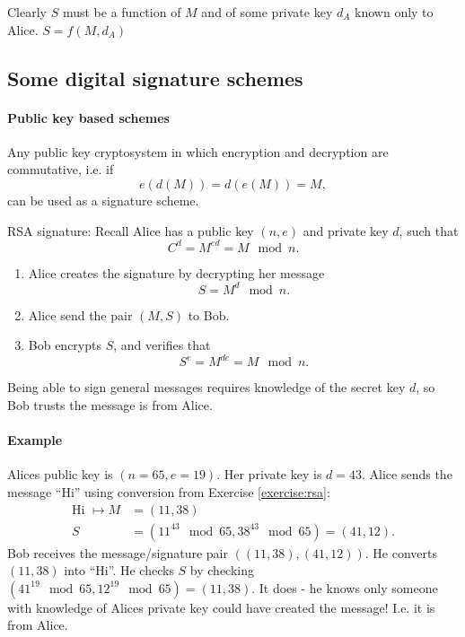 \documentclass[a4paper, 11pt, openany]{book}
\begin{document}
Clearly $S$ must be a function of $M$ and of some private key $d_A$ known only to Alice. $S = f(M,d_A)$


\subsection{Some digital signature schemes}

\paragraph{Public key based schemes}


Any public key cryptosystem in which encryption and decryption are commutative, i.e. if
\[
    e(d(M)) = d(e(M)) = M,
\]
can be used as a signature scheme.

RSA signature: Recall Alice has a public key $(n,e)$ and private key $d$, such that
\[
    C^d = M^{ed} = M \mod n.
\]
\begin{enumerate}
    \item Alice creates the signature by decrypting her message
    \[
    	S = M^d \mod n.
    \]

    \item Alice send the pair $(M,S)$ to Bob.

    \item Bob encrypts $S$, and verifies that
    \[
        S^e = M^{de} = M \mod n.
    \]
\end{enumerate}

Being able to sign general messages requires knowledge of the secret key $d$, so Bob trusts the message is from Alice.



\paragraph{Example}

Alices public key is $(n = 65,e = 19)$. Her private key is $d = 43$. Alice sends the message ``Hi'' using conversion from Exercise \ref{exercise:rsa}:
\begin{align*}
    \text{Hi } \mapsto M &= (11, 38)\\
    S &= (11^{43} \mod 65, 38^{43} \mod 65) = (41 , 12).
\end{align*}
Bob receives the message/signature pair $((11,38),(41,12))$. He converts $(11,38)$ into ``Hi''. He checks $S$ by checking $(41^{19} \mod 65, 12^{19} \mod 65) = (11,38)$. It does - he knows only someone with knowledge of Alices private key could have created the message! I.e. it is from Alice.
\end{document}
